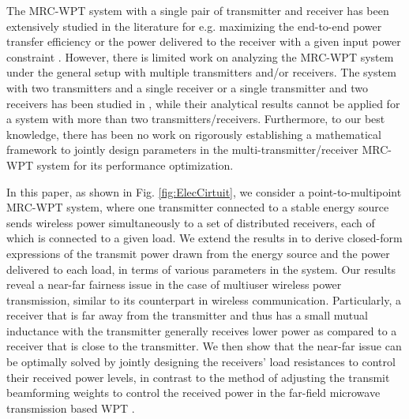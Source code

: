 \documentclass[onecolumn, a4size, 11pt]{IEEEtran}
\begin{document}
The MRC-WPT system with a single pair of transmitter and receiver has been extensively studied in the literature for e.g.   maximizing  the   end-to-end power transfer efficiency or   the power   delivered to the receiver  with a given input power constraint \cite{Cannon,Jonah, YZhang1,YZhang2}. 
However, there is limited work  on analyzing  the MRC-WPT system under the general setup   with multiple  transmitters and/or receivers. 
The system with  two transmitters and a single receiver or a single transmitter and two receivers has been studied in \cite{Yoon,K-Lee, Ahn, Garnica, Johari}, while their analytical  results cannot be applied for a system with more than two transmitters/receivers. 
Furthermore, to our best knowledge,  there has been no work on rigorously establishing a mathematical framework   to jointly design   parameters in the multi-transmitter/receiver MRC-WPT system for its performance optimization.

In this paper, as shown in Fig. \ref{fig:ElecCirtuit}, we consider a point-to-multipoint MRC-WPT  system, where one transmitter connected to a stable energy source sends wireless power simultaneously to a set of distributed receivers, each of which is connected to a given load.
We extend the results in \cite{Yoon,K-Lee, Ahn, Garnica, Johari} to derive  closed-form expressions of the  transmit  power drawn from the energy source and the power  delivered to each load, in terms of  various parameters in the system. 
Our results reveal  a  near-far fairness issue in the case of multiuser wireless power transmission, similar to its counterpart  in wireless communication. 
Particularly,  a receiver that is far away from the transmitter  and thus has a small  mutual inductance with the transmitter generally receives lower power as compared to a receiver that is  close to the transmitter.
We then show  that  the near-far issue can be optimally solved  by jointly designing the receivers' load resistances to control their received power levels, in contrast to  the method of adjusting the transmit beamforming weights to control the received power  in the far-field microwave transmission  based WPT \cite{ZHANG,Xu}. 
\end{document}
